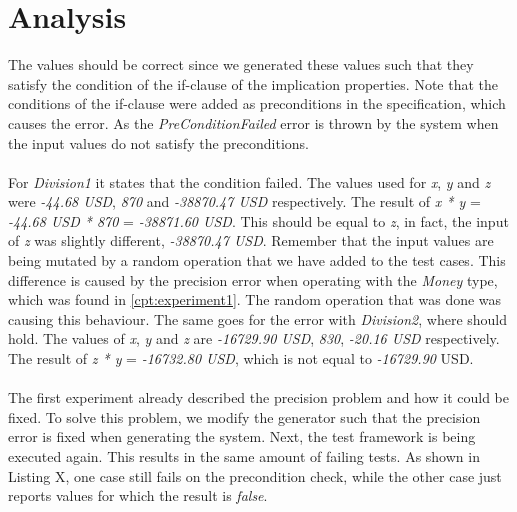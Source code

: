 \section{Analysis}
The values should be correct since we generated these values such that they satisfy the condition of the if-clause of the implication properties. Note that the conditions of the if-clause were added as preconditions in the specification, which causes the error. As the \textit{PreConditionFailed} error is thrown by the system when the input values do not satisfy the preconditions.\\
\\
For \textit{Division1} it states that the condition  failed. The values used for \textit{x}, \textit{y} and \textit{z} were \textit{-44.68 USD}, \textit{870} and \textit{-38870.47 USD} respectively. The result of \textit{x * y} = \textit{-44.68 USD * 870} = \textit{-38871.60 USD}. This should be equal to \textit{z}, in fact, the input of \textit{z} was slightly different, \textit{-38870.47 USD}. Remember that the input values are being mutated by a random operation that we have added to the test cases. This difference is caused by the precision error when operating with the \textit{Money} type, which was found in \autoref{cpt:experiment1}. The random operation that was done was causing this behaviour. The same goes for the error with \textit{Division2}, where  should hold. The values of \textit{x}, \textit{y} and \textit{z} are \textit{-16729.90 USD}, \textit{830}, \textit{-20.16 USD} respectively. The result of \textit{z * y} = \textit{-16732.80 USD}, which is not equal to \textit{-16729.90} USD.\\
\\
The first experiment already described the precision problem and how it could be fixed. To solve this problem, we modify the generator such that the precision error is fixed when generating the system. Next, the test framework is being executed again. This results in the same amount of failing tests. As shown in Listing X, one case still fails on the precondition check, while the other case just reports values for which the result is \textit{false}.


